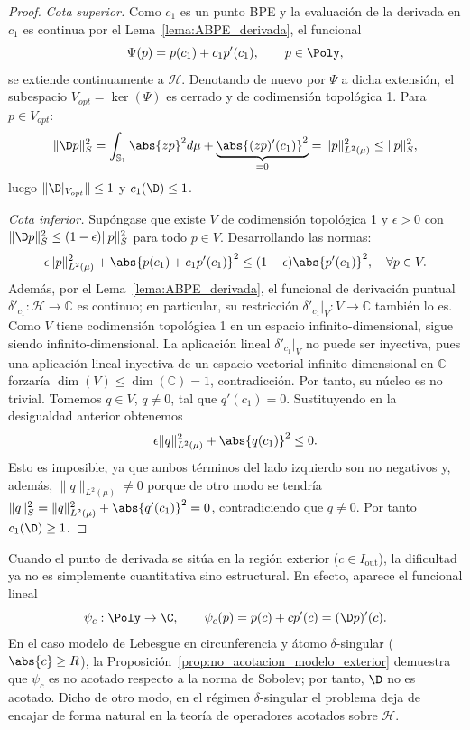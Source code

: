 \begin{proof}
	\emph{Cota superior.} Como $c_1$ es un punto BPE y la evaluación de la derivada en $c_1$ es continua por el Lema~\ref{lema:ABPE_derivada}, el funcional
	\[
		\Psi(p) = p(c_1) + c_1 p'(c_1), \qquad p \in \Poly,
	\]
	se extiende continuamente a $\mathcal{H}$. Denotando de nuevo por $\Psi$ a dicha extensión, el subespacio $V_{opt} = \ker(\Psi)$ es cerrado y de codimensión topológica 1. Para $p \in V_{opt}$:
	\[
		\|\D p\|_S^2 = \int_{\mathbb{S}_1} \abs{zp}^2 d\mu + \underbrace{\abs{(zp)'(c_1)}^2}_{=0} = \|p\|_{L^2(\mu)}^2 \le \|p\|_S^2,
	\]
	luego $\|\D|_{V_{opt}}\| \le 1$ y $c_1(\D) \le 1$.

	\emph{Cota inferior.} Supóngase que existe $V$ de codimensión topológica 1 y $\epsilon > 0$ con $\|\D p\|_S^2 \le (1-\epsilon)\|p\|_S^2$ para todo $p \in V$. Desarrollando las normas:
	\[
		\epsilon \|p\|_{L^2(\mu)}^2 + \abs{p(c_1) + c_1 p'(c_1)}^2 \le (1-\epsilon)\abs{p'(c_1)}^2, \quad \forall p \in V.
	\]
	Además, por el Lema~\ref{lema:ABPE_derivada}, el funcional de derivación puntual $\delta'_{c_1}: \mathcal{H} \to \mathbb{C}$ es continuo; en particular, su restricción $\delta'_{c_1}|_V : V \to \mathbb{C}$ también lo es. Como $V$ tiene codimensión topológica 1 en un espacio infinito-dimensional, sigue siendo infinito-dimensional. La aplicación lineal $\delta'_{c_1}|_V$ no puede ser inyectiva, pues una aplicación lineal inyectiva de un espacio vectorial infinito-dimensional en $\mathbb{C}$ forzaría $\dim(V) \leq \dim(\mathbb{C}) = 1$, contradicción. Por tanto, su núcleo es no trivial. Tomemos $q \in V$, $q \neq 0$, tal que $q'(c_1)=0$. Sustituyendo en la desigualdad anterior obtenemos
	\[
		\epsilon \|q\|_{L^2(\mu)}^2 + \abs{q(c_1)}^2 \le 0.
	\]
	Esto es imposible, ya que ambos términos del lado izquierdo son no negativos y, además, $\|q\|_{L^2(\mu)} \neq 0$ porque de otro modo se tendría $\|q\|_S^2 = \|q\|_{L^2(\mu)}^2 + \abs{q'(c_1)}^2 = 0$, contradiciendo que $q \neq 0$. Por tanto $c_1(\D) \ge 1$.
\end{proof}

Cuando el punto de derivada se sitúa en la región exterior ($c \in I_{\mathrm{out}}$), la dificultad ya no es simplemente cuantitativa sino estructural. En efecto, aparece el funcional lineal
\[
	\psi_c:\Poly\to\C,
	\qquad
	\psi_c(p)=p(c)+c p'(c)=(\D p)'(c).
\]
En el caso modelo de Lebesgue en circunferencia y átomo $\delta$-singular ($\abs{c}\ge R$), la Proposición~\ref{prop:no_acotacion_modelo_exterior} demuestra que $\psi_c$ es no acotado respecto a la norma de Sobolev; por tanto, $\D$ no es acotado. Dicho de otro modo, en el régimen $\delta$-singular el problema deja de encajar de forma natural en la teoría de operadores acotados sobre $\mathcal{H}$.

